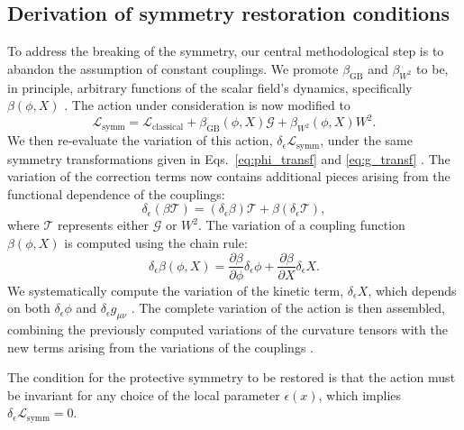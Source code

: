 \documentclass[twocolumn]{aastex631}
\begin{document}
\subsection{Derivation of symmetry restoration conditions}
To address the breaking of the symmetry, our central methodological step is to abandon the assumption of constant couplings. We promote $\beta_{\text{GB}}$ and $\beta_{W^2}$ to be, in principle, arbitrary functions of the scalar field's dynamics, specifically $\beta(\phi, X)$ \citep{millano2023globaldynamicseinsteingaussbonnetscalar}. The action under consideration is now modified to
\begin{equation}
\mathcal{L}_{\text{symm}} = \mathcal{L}_{\text{classical}} + \beta_{\text{GB}}(\phi, X) \mathcal{G} + \beta_{W^2}(\phi, X) W^2.
\end{equation}
We then re-evaluate the variation of this action, $\delta_\epsilon \mathcal{L}_{\text{symm}}$, under the same symmetry transformations given in Eqs.~\eqref{eq:phi_transf} and \eqref{eq:g_transf} \citep{gracia1995gaugetransformationshigherorderlagrangians,accornero2021symmetrytransformationsextremalshigher}. The variation of the correction terms now contains additional pieces arising from the functional dependence of the couplings:
\begin{equation}
\delta_\epsilon(\beta\mathcal{T}) = (\delta_\epsilon \beta)\mathcal{T} + \beta(\delta_\epsilon\mathcal{T}),
\end{equation}
where $\mathcal{T}$ represents either $\mathcal{G}$ or $W^2$. The variation of a coupling function $\beta(\phi, X)$ is computed using the chain rule:
\begin{equation}
\delta_\epsilon \beta(\phi, X) = \frac{\partial\beta}{\partial\phi} \delta_\epsilon\phi + \frac{\partial\beta}{\partial X} \delta_\epsilon X.
\end{equation}
We systematically compute the variation of the kinetic term, $\delta_\epsilon X$, which depends on both $\delta_\epsilon \phi$ and $\delta_\epsilon g_{\mu\nu}$ \citep{arık2025exteriorcalculusquadraticgravity}. The complete variation of the action is then assembled, combining the previously computed variations of the curvature tensors with the new terms arising from the variations of the couplings \citep{arık2025exteriorcalculusquadraticgravity}.

The condition for the protective symmetry to be restored is that the action must be invariant for any choice of the local parameter $\epsilon(x)$, which implies $\delta_\epsilon \mathcal{L}_{\text{symm}} = 0$. 
\end{document}
